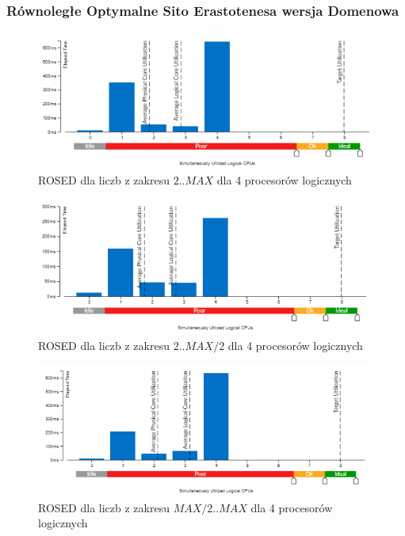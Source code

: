 \documentclass{article}
\begin{document}
            \subsubsection{Równoległe Optymalne Sito Erastotenesa wersja Domenowa}
                \begin{figure}[H]
                    \includegraphics[width=13cm]{rownolegly_domain_opt4_2_MAX}
                    \caption{\gls{ROSED} dla liczb z zakresu $2 .. MAX$ dla 4 procesorów logicznych}
                \end{figure}
                \begin{figure}[H]
                    \includegraphics[width=13cm]{rownolegly_domain_opt4_2_MAX2}
                    \caption{\gls{ROSED} dla liczb z zakresu $2 .. MAX / 2$ dla 4 procesorów logicznych}
                \end{figure}
                \begin{figure}[H]
                    \includegraphics[width=13cm]{rownolegly_domain_opt4_MAX2_MAX}
                    \caption{\gls{ROSED} dla liczb z zakresu $MAX / 2 .. MAX$ dla 4 procesorów logicznych}
                \end{figure}
\end{document}
